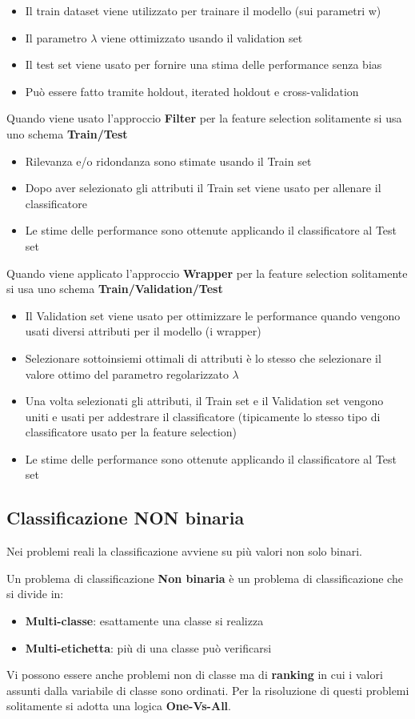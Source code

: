 \begin{itemize}
	\item Il train dataset viene utilizzato per trainare il modello (sui parametri w)
	\item Il parametro $\lambda$ viene ottimizzato usando il validation set
	\item Il test set viene usato per fornire una stima delle performance senza bias
	\item Può essere fatto tramite holdout, iterated holdout e cross-validation
\end{itemize}
Quando viene usato l'approccio \textbf{Filter} per la feature selection solitamente si usa uno schema \textbf{Train/Test}
\begin{itemize}
	\item Rilevanza e/o ridondanza sono stimate usando il Train set
	\item Dopo aver selezionato gli attributi il Train set viene usato per allenare il classificatore
	\item Le stime delle performance sono ottenute applicando il classificatore al Test set
\end{itemize}
Quando viene applicato l'approccio \textbf{Wrapper} per la feature selection solitamente si usa uno schema \textbf{Train/Validation/Test}
\begin{itemize}
	\item Il Validation set viene usato per ottimizzare le performance quando vengono usati diversi attributi per il modello (i wrapper)
	\item Selezionare sottoinsiemi ottimali di attributi è lo stesso che selezionare il valore ottimo del parametro regolarizzato $\lambda$
	\item Una volta selezionati gli attributi, il Train set e il Validation set vengono uniti e usati per addestrare il classificatore (tipicamente lo stesso tipo di classificatore usato per la feature selection)
	\item Le stime delle performance sono ottenute applicando il classificatore al Test set
\end{itemize}

\subsection{Classificazione NON binaria}
Nei problemi reali la classificazione avviene su più valori non solo binari.
\begin{defn}
	Un problema di classificazione \textbf{Non binaria} è un problema di classificazione che si divide in:
	\begin{itemize}
		\item \textbf{Multi-classe}: esattamente una classe si realizza
		\item \textbf{Multi-etichetta}: più di una classe può verificarsi
	\end{itemize}
\end{defn}
Vi possono essere anche problemi non di classe ma di \textbf{ranking} in cui i valori assunti dalla variabile di classe sono ordinati.
Per la risoluzione di questi problemi solitamente si adotta una logica \textbf{One-Vs-All}.

